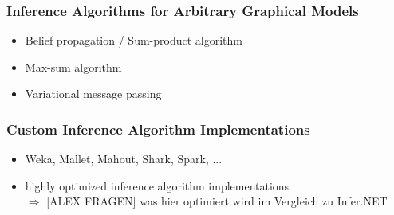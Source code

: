 \subsubsection{Inference Algorithms for Arbitrary Graphical Models}

\begin{itemize}
\item Belief propagation / Sum-product algorithm
\item Max-sum algorithm
\item Variational message passing
\end{itemize}

\subsubsection{Custom Inference Algorithm Implementations}
\label{subsec:custom-inference}

\begin{itemize}
\item Weka, Mallet, Mahout, Shark, Spark, ...
\item highly optimized inference algorithm implementations\\
$\Rightarrow$ [ALEX FRAGEN] was hier optimiert wird im Vergleich zu Infer.NET
\end{itemize}

